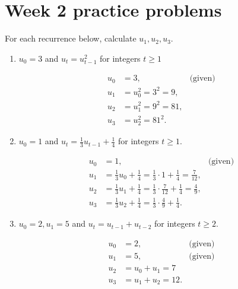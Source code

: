 \documentclass[../main.tex]{subfiles}
\begin{document}
\section{Week 2 practice problems}

\begin{exercise}
  For each recurrence below, calculate \(u_{1}, u_{2}, u_{3}\).
  \begin{enumerate}
    \item \(u_{0} = 3\) and \(u_{t} = u_{t-1}^{2}\) for integers \(t \ge 1\)

      \begin{solution}
        \begin{align*}
          u_{0} &= 3, &\text{(given)} \\
          u_{1} &= u_{0}^{2} = 3^{2} = 9, \\
          u_{2} &= u_{1}^{2} = 9^{2} = 81,\\
          u_{3} &= u_{2}^{2} = 81^{2}. 
        \end{align*}
      \end{solution}

    \item \(u_{0} = 1\) and \(u_{t} = \frac{1}{3} u_{t-1} + \frac{1}{4}\) for integers \(t \ge 1\).

      \begin{solution}
        \begin{align*}
          u_{0} &= 1, &\text{(given)} \\
          u_{1} &= \frac{1}{3}u_{0} + \frac{1}{4} = \frac{1}{3} \cdot 1 + \frac{1}{4} = \frac{7}{12}, \\
          u_{2} &= \frac{1}{3}u_{1} + \frac{1}{4} = \frac{1}{3} \cdot \frac{7}{12} + \frac{1}{4} = \frac{4}{9}, \\
          u_{3} &= \frac{1}{3}u_{2} + \frac{1}{4} = \frac{1}{3} \cdot \frac{4}{9} + \frac{1}{4}.
        \end{align*}
      \end{solution}

    \item \(u_{0} = 2, u_{1} = 5\) and \(u_{t} =  u_{t-1} + u_{t-2}\) for integers \(t \ge 2\).
      \begin{solution}
        \begin{align*}
          u_{0} &= 2, &\text{(given)} \\
          u_{1} &= 5, &\text{(given)} \\
          u_{2} &= u_{0} + u_{1} = 7 \\
          u_{3} &= u_{1} + u_{2} = 12.
        \end{align*}
      \end{solution}
  \end{enumerate}
\end{exercise}
\end{document}
